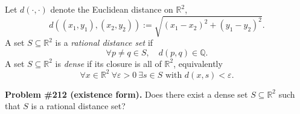 Let $d(\cdot,\cdot)$ denote the Euclidean distance on $\mathbb{R}^2$,
\[d((x_1,y_1),(x_2,y_2)) := \sqrt{(x_1-x_2)^2+(y_1-y_2)^2}.\]
A set $S\subseteq\mathbb{R}^2$ is a \emph{rational distance set} if
\[\forall p\neq q\in S,\quad d(p,q)\in\mathbb{Q}.\]
A set $S\subseteq\mathbb{R}^2$ is \emph{dense} if its closure is all of $\mathbb{R}^2$, equivalently
\[\forall x\in\mathbb{R}^2\ \forall \varepsilon>0\ \exists s\in S\text{ with } d(x,s)<\varepsilon.\]

\noindent\textbf{Problem \#212 (existence form).}
Does there exist a dense set $S\subseteq\mathbb{R}^2$ such that $S$ is a rational distance set?
